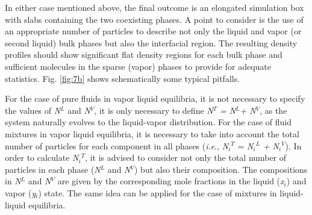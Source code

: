 \documentclass[9pt,bestpractices]{livecoms}
\begin{document}
In either case mentioned above, the final outcome is an elongated simulation
box with slabs containing the two coexisting phases. A point to consider is the
use of an appropriate number of particles to describe not only the liquid and
vapor (or second liquid) bulk phases but also the interfacial region. The
resulting density profiles should show significant flat density regions for
each bulk phase and sufficient molecules in the sparse (vapor) phases to
provide for adequate statistics. Fig. \ref{fig:7b} shows schematically some typical
pitfalls.

For the case of pure fluids in vapor \textendash{} liquid equilibria, it is not
necessary to specify the values of \textit{N}$^{L}$ and \textit{N}$^{V}$, it is
only necessary to define \textit{N}$^{T}$ \textit{= N}$^{L}$\textit{+ N}$^{V}$,
as the system naturally evolves to the liquid-vapor distribution. For the case
of fluid mixtures in vapor \textendash{} liquid equilibria, it is necessary to
take into account the total number of particles for each component in all
phases (\textit{i.e}., \textit{N}$_{i}$$^{T}$ = \textit{N}$_{i}$$^{L}$
\textit{+ N}$_{i}$$^{V}$). In order to calculate \textit{N}$_{i}$$^{T}$, it is
advised to consider not only the total number of particles in each phase
(\textit{N}$^{L}$ and \textit{N}$^{V}$) but also their composition. The
compositions in \textit{N}$^{L}$ and \textit{N}$^{V}$ are given by the
corresponding mole fractions in the liquid (\textit{x}$_{i}$) and vapor
(\textit{y}$_{i}$) state. The same idea can be applied for the case of mixtures
in liquid-liquid equilibria.
\end{document}
